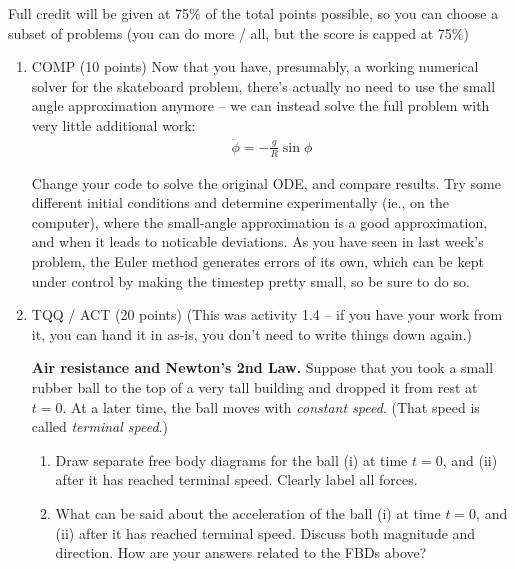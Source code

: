 \documentclass[12pt]{article}
\begin{document}
Full credit will be given at 75\% of the total points possible, so you can choose a subset of problems (you can do more / all, but the score is capped at 75\%)

\begin{enumerate}
  \item COMP (10 points) Now that you have, presumably, a working numerical solver for the skateboard problem, there's actually no need to use the small angle approximation anymore -- we can instead solve the full problem with very  little additional work:
        \begin{align}
          \ddot \phi = -\frac{g}{R} \sin \phi
        \end{align}

        Change your code to solve the original ODE, and compare results. Try some different initial conditions and determine experimentally (ie., on the computer), where the small-angle approximation is a good approximation, and when it leads to noticable deviations. As you have seen in last week's problem, the Euler method generates errors of its own, which can be kept under control by making the timestep pretty small, so be sure to do so.


  \item TQQ / ACT (20 points) (This was activity 1.4 -- if you have your work from it, you can hand it in as-is, you don't need to write things down again.)

        \textbf{Air resistance and Newton's 2nd Law.} Suppose that you took a small rubber ball to the top of a very tall building and dropped it from rest at $t = 0$. At a later time, the ball moves with \textit{constant speed}. (That speed is called \textit{terminal speed}.)


        \begin{enumerate}
          \item

                Draw separate free body diagrams for the ball (i) at time $t = 0$, and (ii) after it has reached terminal speed. Clearly label all forces.

          \item
                What can be said about the acceleration of the ball (i) at time $t = 0$, and (ii) after it has reached terminal speed. Discuss both magnitude and direction. How are your answers related to the FBDs above?


\end{enumerate}
\end{enumerate}
\end{document}
